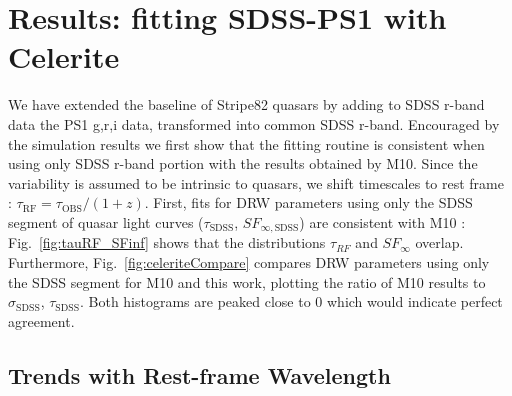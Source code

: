 \documentclass[twocolumn]{aastex62}
\begin{document}
\section{Results: fitting SDSS-PS1 with Celerite}\label{sec:results}

We have extended the baseline of Stripe82 quasars by adding to SDSS r-band data the  PS1 g,r,i data, transformed into common SDSS r-band. Encouraged by the simulation results we first show that the fitting routine is consistent when using only SDSS r-band portion with the results obtained by M10. Since the variability is assumed to be intrinsic to quasars, we shift timescales to rest frame : $\tau_{\mathrm{RF}} = \tau_{\mathrm{OBS}} / (1+z)$.  First, fits for DRW parameters using only the SDSS segment of quasar light curves ($\tau_{\mathrm{SDSS}}$, $SF_{\infty, \mathrm{SDSS}}$) are consistent with M10 : Fig.~\ref{fig:tauRF_SFinf}  shows that the distributions  $\tau_{RF}$ and $SF_{\infty}$ overlap. Furthermore, Fig.~\ref{fig:celeriteCompare} compares DRW parameters using only the SDSS segment for M10 and this work, plotting the ratio of M10 results to $\sigma_{\mathrm{SDSS}}$, $\tau_{\mathrm{SDSS}}$. Both histograms are peaked close to 0 which would indicate perfect agreement. 

\begin{figure*}
\caption{Comparing the rest-frame timescales $\tau$, and asymptotic variability amplitudes $SF_{\infty}$, for \citet{macleod2011} SDSS r-band,  and combined SDSS and PS1 data.  }
\label{fig:tauRF_SFinf}
\end{figure*} 



\begin{figure*}
\caption{Plot comparing results for SDSS r-band fitting of \citet{macleod2011} ($\sigma_{m}, \tau_{m}$), and current results for SDSS r-band using Celerite ($\sigma_{fit}, \tau_{fit}$). }
\label{fig:celeriteCompare}
\end{figure*} 





\subsection{Trends with Rest-frame Wavelength}
\end{document}

